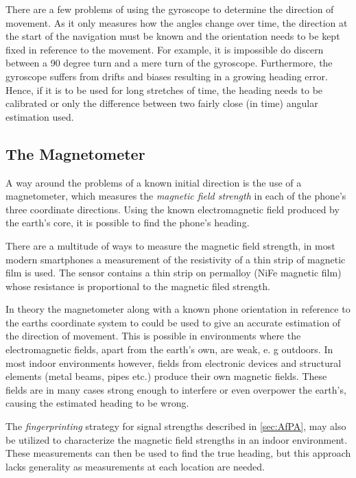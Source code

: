 \documentclass{LTHthesis}
\begin{document}
There are a few problems of using the gyroscope to determine the direction of movement. As it only measures how the angles change over time, the direction at the start of the navigation must be known and the orientation needs to be kept fixed in reference to the movement. For example, it is impossible do discern between a 90 degree turn and a mere turn of the gyroscope.  Furthermore, the gyroscope suffers from drifts and biases resulting in a growing heading error. Hence, if it is to be used for long stretches of time, the heading needs to be calibrated or only the difference between two fairly close (in time) angular estimation used. 
%
\subsection{The Magnetometer}
\label{subsec:mag}
%
A way around the problems of a known initial direction is the use of a magnetometer, which measures the \emph{magnetic field strength} in each of the phone's three coordinate directions. Using the known electromagnetic field produced by the earth's core, it is possible to find the phone's heading.

There are a multitude of ways to measure the magnetic field strength, in most modern smartphones a measurement of the resistivity of a thin strip of magnetic film is used. The sensor contains a thin strip on permalloy (NiFe magnetic film) whose resistance is proportional to the magnetic filed strength.  

In theory the magnetometer along with a known phone orientation in reference to the earths coordinate system to could be used to give an accurate estimation of the direction of movement. This is possible in environments where the electromagnetic fields, apart from the earth's own, are weak, e. g outdoors. In most indoor environments however, fields from electronic devices and structural elements (metal beams, pipes etc.) produce their own magnetic fields. These fields are in many cases strong enough to interfere or even overpower the earth's, causing the estimated heading to be wrong. 

The \emph{fingerprinting} strategy for signal strengths described in \ref{sec:AfPA}, may also be utilized to characterize the magnetic field strengths in an indoor environment. These measurements can then be used to find the true heading, but this approach lacks generality as measurements at each location are needed.  
%
\end{document}
